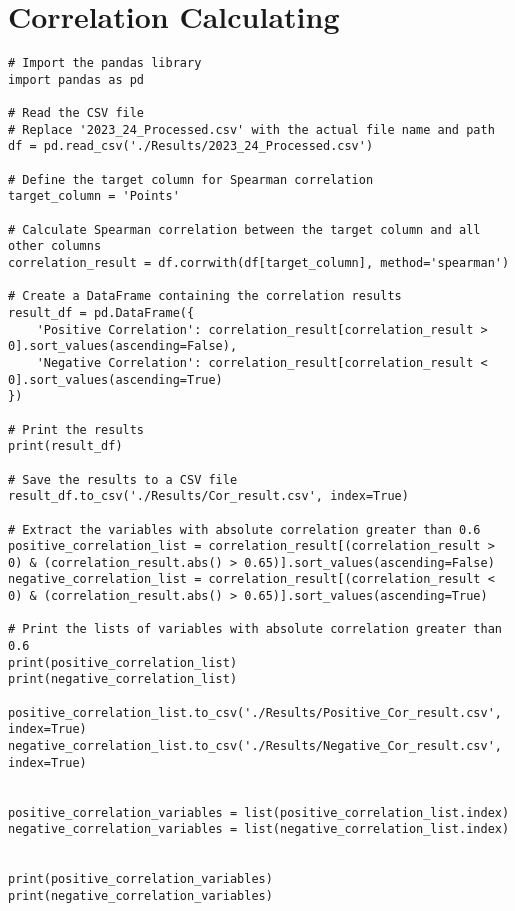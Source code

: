 \section{Correlation Calculating}\label{sec:CC}
% 
% 
% 
\begin{lstlisting}[style=pystyle]
# Import the pandas library
import pandas as pd

# Read the CSV file
# Replace '2023_24_Processed.csv' with the actual file name and path
df = pd.read_csv('./Results/2023_24_Processed.csv')

# Define the target column for Spearman correlation
target_column = 'Points'

# Calculate Spearman correlation between the target column and all other columns
correlation_result = df.corrwith(df[target_column], method='spearman')

# Create a DataFrame containing the correlation results
result_df = pd.DataFrame({
    'Positive Correlation': correlation_result[correlation_result > 0].sort_values(ascending=False),
    'Negative Correlation': correlation_result[correlation_result < 0].sort_values(ascending=True)
})

# Print the results
print(result_df)

# Save the results to a CSV file
result_df.to_csv('./Results/Cor_result.csv', index=True)

# Extract the variables with absolute correlation greater than 0.6
positive_correlation_list = correlation_result[(correlation_result > 0) & (correlation_result.abs() > 0.65)].sort_values(ascending=False)
negative_correlation_list = correlation_result[(correlation_result < 0) & (correlation_result.abs() > 0.65)].sort_values(ascending=True)

# Print the lists of variables with absolute correlation greater than 0.6
print(positive_correlation_list)
print(negative_correlation_list)

positive_correlation_list.to_csv('./Results/Positive_Cor_result.csv', index=True)
negative_correlation_list.to_csv('./Results/Negative_Cor_result.csv', index=True)


positive_correlation_variables = list(positive_correlation_list.index)
negative_correlation_variables = list(negative_correlation_list.index)


print(positive_correlation_variables)
print(negative_correlation_variables)
\end{lstlisting}
% 
% 
% 
% 
% 
% 
% 
% 
% 
% 
% 
% 
% 
% 
% 
% 
% 
% 
% 
% 
% 
% 
% 
% 
% 
